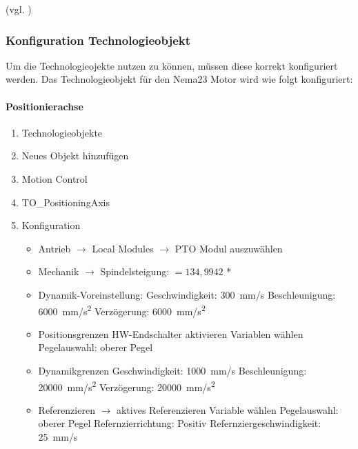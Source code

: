 (vgl. \cite{Tia-Portal_Informationssystem})

\subsubsection{Konfiguration Technologieobjekt}
Um die Technologieojekte nutzen zu können, müssen diese korrekt konfiguriert werden. Das Technologieobjekt für den Nema23 Motor wird wie folgt konfiguriert:

\paragraph{Positionierachse}
    
        \begin{enumerate}
            \item Technologieobjekte
            \item Neues Objekt hinzufügen
            \item Motion Control
            \item TO\_PositioningAxis
            \item Konfiguration
            
                \begin{itemize}

                \item Antrieb $\rightarrow$ Local Modules $\rightarrow$ PTO Modul auszuwählen
                \item Mechanik $\rightarrow$ Spindelsteigung: $= 134,9942$ *
                \item Dynamik-Voreinstellung: 
                    \subitem Geschwindigkeit:
                        \qty{300}{\milli\meter/\second}
                    \subitem Beschleunigung: 
                        \qty{6000}{\milli\meter/\square\second}
                    \subitem Verzögerung:
                        \qty{6000}{\milli\meter/\square\second}
                \item Positionsgrenzen
                    \subitem HW-Endschalter aktivieren
                    \subitem Variablen wählen
                    \subitem Pegelauswahl: oberer Pegel
                \item Dynamikgrenzen
                    \subitem Geschwindigkeit:
                        \qty{1000}{\milli\meter/\second}
                    \subitem Beschleunigung: 
                        \qty{20000}{\milli\meter/\square\second}
                    \subitem Verzögerung:
                        \qty{20000}{\milli\meter/\square\second}
                \item Referenzieren $\rightarrow$ aktives Referenzieren
                    \subitem Variable wählen
                    \subitem Pegelauswahl: oberer Pegel
                    \subitem Refernzierrichtung: Positiv
                    \subitem Refernziergeschwindigkeit:
                        \qty{25}{\milli\meter/\second}
                
                \end{itemize}
        \end{enumerate}

